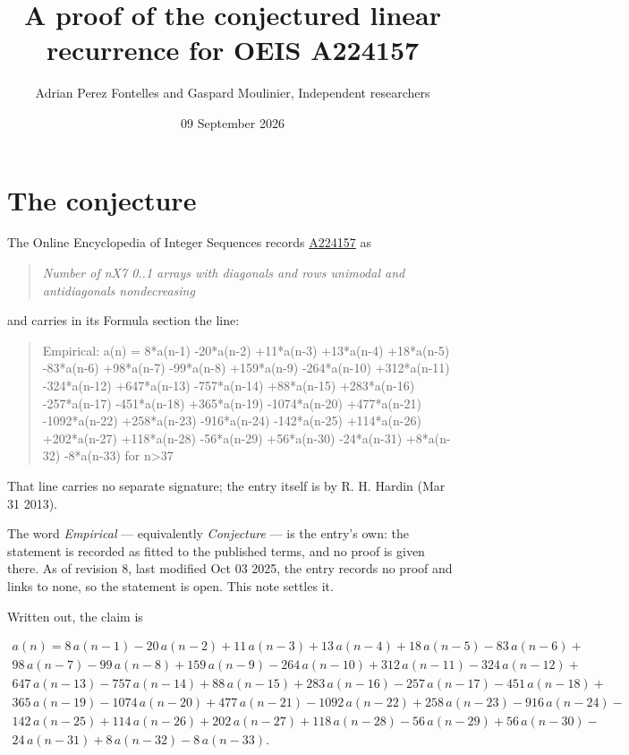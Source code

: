 \documentclass[11pt]{article}
\title{A proof of the conjectured linear recurrence for OEIS A224157}
\author{Adrian Perez Fontelles and Gaspard Moulinier, Independent researchers}
\date{09 September 2026}
\theoremstyle{definition}
\begin{document}
\maketitle
\section{The conjecture}

The Online Encyclopedia of Integer Sequences records \href{https://oeis.org/A224157}{A224157} as

\begin{quote}\itshape Number of nX7 0..1 arrays with diagonals and rows unimodal and antidiagonals nondecreasing\end{quote}

and carries in its Formula section the line:

\begin{quote}\ttfamily Empirical: a(n) = 8*a(n-1) -20*a(n-2) +11*a(n-3) +13*a(n-4) +18*a(n-5) -83*a(n-6) +98*a(n-7) -99*a(n-8) +159*a(n-9) -264*a(n-10) +312*a(n-11) -324*a(n-12) +647*a(n-13) -757*a(n-14) +88*a(n-15) +283*a(n-16) -257*a(n-17) -451*a(n-18) +365*a(n-19) -1074*a(n-20) +477*a(n-21) -1092*a(n-22) +258*a(n-23) -916*a(n-24) -142*a(n-25) +114*a(n-26) +202*a(n-27) +118*a(n-28) -56*a(n-29) +56*a(n-30) -24*a(n-31) +8*a(n-32) -8*a(n-33) for n>37\end{quote}

That line carries no separate signature; the entry itself is by R. H. Hardin (Mar 31 2013).

The word {\itshape Empirical} --- equivalently {\itshape Conjecture} --- is the entry's own: the statement is recorded as fitted to the published terms, and no proof is given there. As of revision 8, last modified Oct 03 2025, the entry records no proof and links to none, so the statement is open. This note settles it.

Written out, the claim is

\begin{multline*} a(n) = 8\,a(n-1) - 20\,a(n-2) + 11\,a(n-3) + 13\,a(n-4) + 18\,a(n-5) - 83\,a(n-6) + \\ 98\,a(n-7) - 99\,a(n-8) + 159\,a(n-9) - 264\,a(n-10) + 312\,a(n-11) - 324\,a(n-12) + \\ 647\,a(n-13) - 757\,a(n-14) + 88\,a(n-15) + 283\,a(n-16) - 257\,a(n-17) - 451\,a(n-18) + \\ 365\,a(n-19) - 1074\,a(n-20) + 477\,a(n-21) - 1092\,a(n-22) + 258\,a(n-23) - 916\,a(n-24) - \\ 142\,a(n-25) + 114\,a(n-26) + 202\,a(n-27) + 118\,a(n-28) - 56\,a(n-29) + 56\,a(n-30) - \\ 24\,a(n-31) + 8\,a(n-32) - 8\,a(n-33). \end{multline*}
\end{document}
